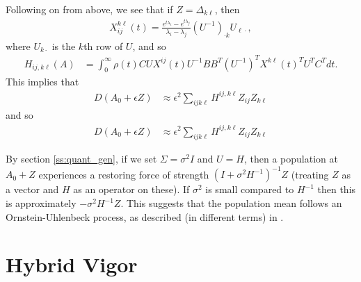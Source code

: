 \documentclass{article}
\newcommand{\1}{\mathbbm{1}}
\begin{document}
Following on from above, we see that if $Z=\Delta_{k \ell}$, then
\begin{equation}
  \begin{aligned}
      X_{ij}^{k\ell}(t) = 
      \frac{ e^{t \lambda_i} - e^{t \lambda_j} }{ \lambda_i - \lambda_j } 
      (U^{-1})_{\cdot k} U_{\ell \cdot},
  \end{aligned}
\end{equation}
where $U_{k \cdot}$ is the $k$th row of $U$,
and so
\begin{equation}
    \begin{aligned}
        H_{ij, k\ell}(A)
        &=
        \int_0^\infty
            \rho(t) C U X^{ij}(t) U^{-1} B B^T (U^{-1})^T X^{k\ell}(t)^T U^T C^T
        dt .
    \end{aligned}
\end{equation}
This implies that
\begin{equation}
    \begin{aligned}
        D(A_0+\epsilon Z)
        &\approx \epsilon^2\sum_{ijk\ell} H^{ij,k\ell} Z_{ij} Z_{k\ell} 
    \end{aligned}
\end{equation}
and so
\begin{equation}
    \begin{aligned}
        D(A_0+\epsilon Z)
        &\approx \epsilon^2\sum_{ijk\ell} H^{ij,k\ell} Z_{ij} Z_{k\ell} 
    \end{aligned}
\end{equation}

By section \ref{ss:quant_gen},
if we set $\Sigma=\sigma^2 I$ and $U=H$,
then a population at $A_0+Z$ experiences a restoring force of strength
$(I + \sigma^2 H^{-1})^{-1} Z$ (treating $Z$ as a vector and $H$ as an operator on these).
If $\sigma^2$ is small compared to $H^{-1}$
then this is approximately $-\sigma^2 H^{-1} Z$.
This suggests that the population mean follows an Ornstein-Uhlenbeck process,
as described (in different terms) in \citet{hansen1996translating}.

\section{Hybrid Vigor}
\end{document}

